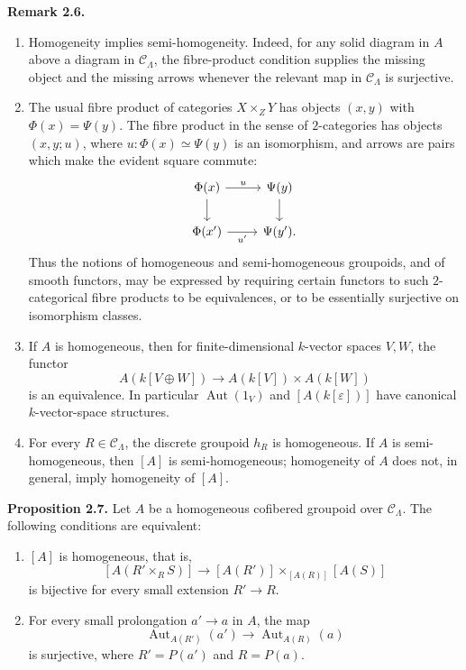 \documentclass[11pt]{article}
\providecommand{\Aut}{\operatorname{Aut}}
\begin{document}
\textbf{Remark 2.6.}
\begin{enumerate}[label=(\alph*)]
\item Homogeneity implies semi-homogeneity. Indeed, for any solid diagram in \(A\) above
a diagram in \(\mathcal C_\Lambda\), the fibre-product condition supplies the missing
object and the missing arrows whenever the relevant map in \(\mathcal C_\Lambda\) is
surjective.

\item The usual fibre product of categories \(X\times_ZY\) has objects \((x,y)\) with
\(\Phi(x)=\Psi(y)\). The fibre product in the sense of \(2\)-categories has objects
\((x,y;u)\), where \(u:\Phi(x)\simeq\Psi(y)\) is an isomorphism, and arrows are pairs
which make the evident square commute:
\[
\begin{tikzcd}
\Phi(x) \arrow[r,"u"] \arrow[d] & \Psi(y) \arrow[d]\\
\Phi(x') \arrow[r,"u'"'] & \Psi(y').
\end{tikzcd}
\]
Thus the notions of homogeneous and semi-homogeneous groupoids, and of smooth functors,
may be expressed by requiring certain functors to such \(2\)-categorical fibre products
to be equivalences, or to be essentially surjective on isomorphism classes.

\item If \(A\) is homogeneous, then for finite-dimensional \(k\)-vector spaces \(V,W\), the
functor
\[
 A(k[V\oplus W])\longrightarrow A(k[V])\times A(k[W])
\]
is an equivalence. In particular \(\Aut(1_V)\) and \([A(k[\varepsilon])]\) have canonical
\(k\)-vector-space structures.

\item For every \(R\in\mathcal C_\Lambda\), the discrete groupoid \(h_R\) is homogeneous.
If \(A\) is semi-homogeneous, then \([A]\) is semi-homogeneous; homogeneity of \(A\) does
not, in general, imply homogeneity of \([A]\).
\end{enumerate}

\textbf{Proposition 2.7.} Let \(A\) be a homogeneous cofibered groupoid over
\(\mathcal C_\Lambda\). The following conditions are equivalent:
\begin{enumerate}[label=(\roman*)]
\item \([A]\) is homogeneous, that is,
\[
 [A(R'\times_R S)]\longrightarrow [A(R')]\times_{[A(R)]}[A(S)]
\]
is bijective for every small extension \(R'\to R\).
\item For every small prolongation \(a'\to a\) in \(A\), the map
\[
 \Aut_{A(R')}(a')\longrightarrow \Aut_{A(R)}(a)
\]
is surjective, where \(R'=P(a')\) and \(R=P(a)\).
\end{enumerate}
\end{document}
